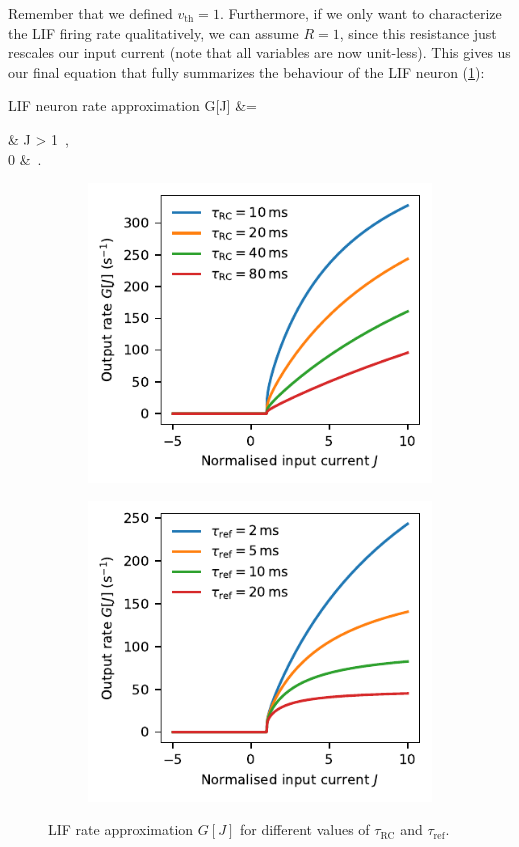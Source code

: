 \documentclass[10pt,letterpaper,oneside]{article}
\begin{document}
Remember that we defined $v_\mathrm{th} = 1$. Furthermore, if we only want to characterize the LIF firing rate qualitatively, we can assume $R = 1$, since this resistance just rescales our input current (note that all variables are now unit-less). This gives us our final equation that fully summarizes the behaviour of the LIF neuron (\cref{fig:lif_neuron_rate}):
\begin{ImportantEqn}{LIF neuron rate approximation}
	G[J]
	&= \begin{cases}
	 &  J > 1 \,,\\
	0 &  \,.
	\end{cases}
\end{ImportantEqn}


\begin{figure}
	\centering%
	\begin{subfigure}{0.5\textwidth}%
		\centering%
		\includegraphics{media/lif_neuron_rate_tau_rc.pdf}%
	\end{subfigure}%
	\begin{subfigure}{0.5\textwidth}%
		\centering%
		\includegraphics{media/lif_neuron_rate_tau_ref.pdf}%
	\end{subfigure}%
	\caption{LIF rate approximation $G[J]$ for different values of $\tau_\mathrm{RC}$ and $\tau_\mathrm{ref}$.}
	\label{fig:lif_neuron_rate}
\end{figure}
\end{document}
